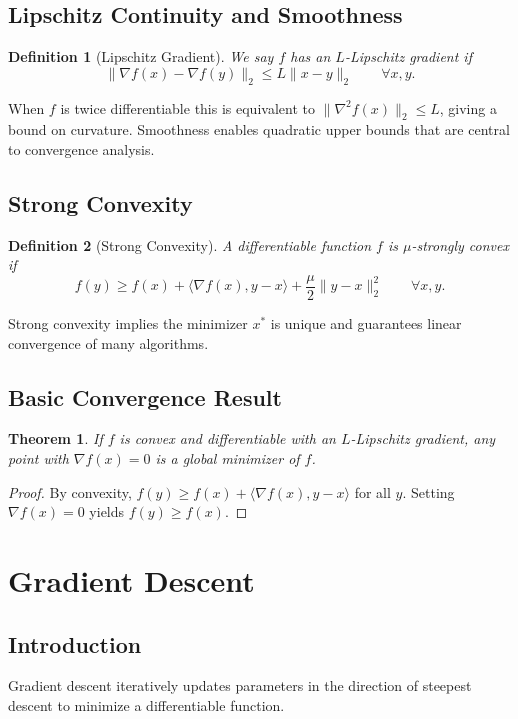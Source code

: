 \documentclass[11pt]{book}
\newtheorem{theorem}{Theorem}[chapter]
\newtheorem{definition}{Definition}[chapter]
\begin{document}
\subsection{Lipschitz Continuity and Smoothness}
\begin{definition}[Lipschitz Gradient]
We say $f$ has an $L$-Lipschitz gradient if
\begin{equation}
\|\nabla f(x)-\nabla f(y)\|_2\le L\|x-y\|_2 \qquad \forall x,y.
\end{equation}
\end{definition}
When $f$ is twice differentiable this is equivalent to $\|\nabla^2 f(x)\|_2\le L$, giving a bound on curvature. Smoothness enables quadratic upper bounds that are central to convergence analysis.

\subsection{Strong Convexity}
\begin{definition}[Strong Convexity]
A differentiable function $f$ is \emph{$\mu$-strongly convex} if
\begin{equation}
f(y)\ge f(x)+\langle\nabla f(x),y-x\rangle+\frac{\mu}{2}\|y-x\|_2^2 \qquad \forall x,y.
\end{equation}
\end{definition}
Strong convexity implies the minimizer $x^*$ is unique and guarantees linear convergence of many algorithms.

\subsection{Basic Convergence Result}
\begin{theorem}
If $f$ is convex and differentiable with an $L$-Lipschitz gradient, any point with $\nabla f(x)=0$ is a global minimizer of $f$.
\end{theorem}
\begin{proof}
By convexity, $f(y)\ge f(x)+\langle\nabla f(x),y-x\rangle$ for all $y$. Setting $\nabla f(x)=0$ yields $f(y)\ge f(x)$.
\end{proof}

\section{Gradient Descent}
\subsection{Introduction}
Gradient descent iteratively updates parameters in the direction of steepest descent to minimize a differentiable function.
\end{document}
